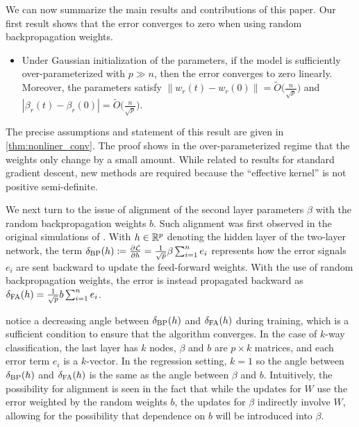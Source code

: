 We can now summarize the main results and contributions of this paper. Our first result shows that the error converges to zero when using random backpropagation weights.

\begin{itemize}
  \item Under Gaussian initialization of the parameters, if the model is sufficiently over-parameterized with $p\gg n$, then the error converges to zero linearly. Moreover, the parameters satisfy $\|w_r(t) - w_r(0) \| = \widetilde O\bigl(\frac{n}{\sqrt{p}}\bigr)$
    and $|\beta_r(t) - \beta_r(0) | = \widetilde O\bigl(\frac{n}{\sqrt{p}}\bigr)$.
\end{itemize}
The precise assumptions and statement of this result are given in \cref{thm:nonliner_conv}. The proof
shows in the over-parameterized regime that the weights only change
by a small amount. While related to results for standard gradient descent,
new methods are required because the ``effective kernel'' is not positive semi-definite.

We next turn to the issue of alignment of the second layer parameters $\beta$ with the random backpropagation weights $b$. Such alignment was first observed in the original simulations of \cite{lillicrap2016random}. With $h\in \mathbb{R}^p$ denoting the hidden layer of the two-layer network,  the term $\delta_\mathrm{BP}(h) \coloneqq \frac{\partial \mathcal{L}}{\partial h} = \frac{1}{\sqrt{p}} \beta \sum_{i=1}^n e_i$ represents
how the error signals $e_i$ are sent backward to update the feed-forward weights.
With the use of random backpropagation weights, the error is instead propagated backward as $\delta_\mathrm{FA}(h) = \frac{1}{\sqrt{p}} b \sum_{i=1}^n e_i$.


\citet{lillicrap2016random} notice a decreasing angle between $\delta_\mathrm{BP}(h)$ and $\delta_\mathrm{FA}(h)$ during training, which is a sufficient condition to ensure that the algorithm converges.
In the case of $k$-way classification, the last layer has $k$ nodes,
$\beta$ and $b$ are $p\times k$ matrices, and each error term $e_i$ is a $k$-vector.
In the regression setting, $k=1$ so the angle between
$\delta_\mathrm{BP}(h)$ and $\delta_\mathrm{FA}(h)$ is the same as the angle between $\beta$ and $b$.
Intuitively, the possibility for alignment is seen in the fact that while the updates for $W$ use the error weighted by the random weights $b$, the updates for $\beta$ indirectly involve $W$, allowing for the possibility that dependence on $b$ will be introduced into $\beta$.

